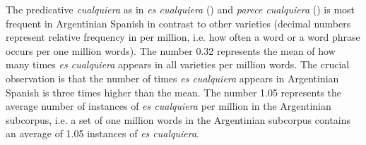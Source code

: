 \documentclass[output=paper]{langscibook}
\begin{document}
  The predicative \textit{cualquiera} as in \textit{es cualquiera} () and \textit{parece cualquiera} () is most frequent in Argentinian Spanish in contrast to other varieties (decimal numbers represent relative frequency in per million, i.e. how often a word or a word phrase occurs per one million words). The number 0.32 represents the mean of how many times \textit{es cualquiera} appears in all varieties per million words. The crucial observation is that the number of times \textit{es cualquiera} appears in Argentinian Spanish is three times higher than the mean. The number 1.05 represents the average number of instances of \textit{es cualquiera} per million in the Argentinian subcorpus, i.e. a set of one million words in the Argentinian subcorpus contains an average of 1.05 instances of \textit{es cualquiera}. 
\end{document}
